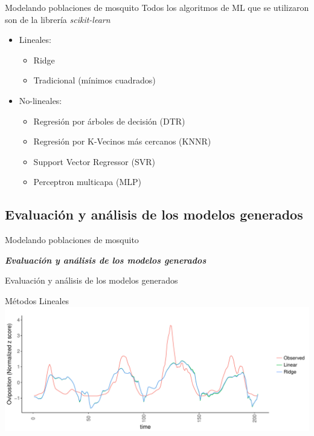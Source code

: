 \documentclass[10pt]{beamer}
\newcommand\IncrFont{\fontsize{20}{20}\selectfont}
\begin{document}
\begin{frame}{Modelando poblaciones de mosquito}
  Todos los algoritmos de ML que se utilizaron son de la librería \textit{scikit-learn}
  \pause
  \begin{itemize}
    \item Lineales:
      \begin{itemize}
        \item Ridge
        \item Tradicional (mínimos cuadrados)
      \end{itemize}
    \item No-lineales:
      \begin{itemize}
        \item Regresión por árboles de decisión (DTR)
        \item Regresión por K-Vecinos más cercanos (KNNR)
        \item Support Vector Regressor (SVR)
        \item Perceptron multicapa (MLP)
      \end{itemize}
  \end{itemize}
\end{frame}


\subsection{Evaluación y análisis de los modelos generados}


\begin{frame}{Modelando poblaciones de mosquito}
  \IncrFont

  \begin{center}
    \textit{\textbf{Evaluación y análisis de los modelos generados}}
  \end{center}
\end{frame}


\begin{frame}{Evaluación y análisis de los modelos generados}
  \begin{center}
    Métodos Lineales
    \includegraphics[width=1\textwidth]{RidgeVsTime}
  \end{center}
\end{frame}
\end{document}
